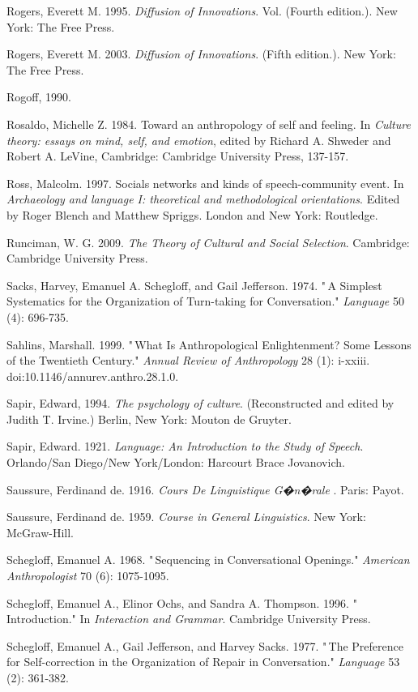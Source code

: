 Rogers, Everett M. 1995. \textit{Diffusion of Innovations}. Vol. 
(Fourth edition.). New York: The Free Press.

Rogers, Everett M. 2003. \textit{Diffusion of Innovations}. (Fifth 
edition.). New York: The Free Press.

Rogoff, 1990.

Rosaldo, Michelle Z. 1984. Toward an anthropology of self and feeling. 
In \textit{Culture theory: essays on mind, self, and emotion}, edited 
by Richard A. Shweder and Robert A. LeVine, Cambridge: Cambridge 
University Press, 137-157.

Ross, Malcolm. 1997. Socials networks and kinds of speech-community 
event. In \textit{Archaeology and language I: theoretical and 
methodological orientations}. Edited by Roger Blench and Matthew 
Spriggs. London and New York: Routledge.

Runciman, W. G. 2009. \textit{The Theory of Cultural and Social 
Selection}. Cambridge: Cambridge University Press.

Sacks, Harvey, Emanuel A. Schegloff, and Gail Jefferson. 1974. "\,A 
Simplest Systematics for the Organization of Turn-taking for 
Conversation." \textit{Language} 50 (4): 696-735.

Sahlins, Marshall. 1999. "\,What Is Anthropological Enlightenment? Some 
Lessons of the Twentieth Century." \textit{Annual Review of 
Anthropology} 28 (1): i-xxiii. doi:10.1146/annurev.anthro.28.1.0.

Sapir, Edward, 1994. \textit{The psychology of culture}. 
(Reconstructed and edited by Judith T. Irvine.) Berlin, New York: Mouton 
de Gruyter.

Sapir, Edward. 1921. \textit{Language: An Introduction to the Study of 
Speech}. Orlando/San Diego/New York/London: Harcourt Brace Jovanovich.

Saussure, Ferdinand de. 1916. \textit{Cours De Linguistique G�n�rale}
. Paris: Payot.

Saussure, Ferdinand de. 1959. \textit{Course in General Linguistics}. 
New York: McGraw-Hill.

Schegloff, Emanuel A. 1968. "\,Sequencing in Conversational Openings." 
\textit{American Anthropologist} 70 (6): 1075-1095.

Schegloff, Emanuel A., Elinor Ochs, and Sandra A. Thompson. 1996. 
"\,Introduction." In \textit{Interaction and Grammar}. Cambridge 
University Press.

Schegloff, Emanuel A., Gail Jefferson, and Harvey Sacks. 1977. "\,The 
Preference for Self-correction in the Organization of Repair in 
Conversation." \textit{Language} 53 (2): 361-382.


